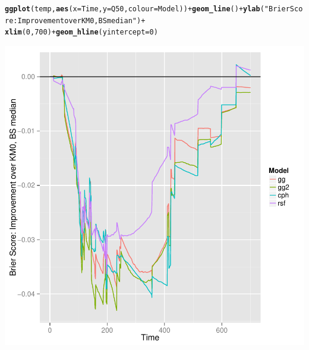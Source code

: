 \documentclass{article}\usepackage[]{graphicx}\usepackage[]{color}
\makeatletter
\def\maxwidth{ %
  \ifdim\Gin@nat@width>\linewidth
    \linewidth
  \else
    \Gin@nat@width
  \fi
}
\newcommand{\hlnum}[1]{\textcolor[rgb]{0.686,0.059,0.569}{#1}}%
\newcommand{\hlstr}[1]{\textcolor[rgb]{0.192,0.494,0.8}{#1}}%
\newcommand{\hlopt}[1]{\textcolor[rgb]{0,0,0}{#1}}%
\newcommand{\hlstd}[1]{\textcolor[rgb]{0.345,0.345,0.345}{#1}}%
\newcommand{\hlkwc}[1]{\textcolor[rgb]{0.333,0.667,0.333}{#1}}%
\newcommand{\hlkwd}[1]{\textcolor[rgb]{0.737,0.353,0.396}{\textbf{#1}}}%
\newenvironment{kframe}{%
 \def\at@end@of@kframe{}%
 \ifinner\ifhmode%
  \def\at@end@of@kframe{\end{minipage}}%
  \begin{minipage}{\columnwidth}%
 \fi\fi%
 \def\FrameCommand##1{\hskip\@totalleftmargin \hskip-\fboxsep
 \colorbox{shadecolor}{##1}\hskip-\fboxsep
     \hskip-\linewidth \hskip-\@totalleftmargin \hskip\columnwidth}%
 \MakeFramed {\advance\hsize-\width
   \@totalleftmargin\z@ \linewidth\hsize
   \@setminipage}}%
 {\par\unskip\endMakeFramed%
 \at@end@of@kframe}
\newenvironment{knitrout}{}{} %
\makeatother
\begin{document}
\begin{knitrout}
{}


\begin{kframe}\begin{alltt}
\hlkwd{ggplot}\hlstd{(temp,} \hlkwd{aes}\hlstd{(}\hlkwc{x} \hlstd{= Time,} \hlkwc{y} \hlstd{= Q50,} \hlkwc{colour} \hlstd{= Model))} \hlopt{+} \hlkwd{geom_line}\hlstd{()} \hlopt{+} \hlkwd{ylab}\hlstd{(}\hlstr{"Brier Score: Improvement over KM0, BS median"}\hlstd{)} \hlopt{+}
    \hlkwd{xlim}\hlstd{(}\hlnum{0}\hlstd{,} \hlnum{700}\hlstd{)} \hlopt{+} \hlkwd{geom_hline}\hlstd{(}\hlkwc{yintercept} \hlstd{=} \hlnum{0}\hlstd{)}
\end{alltt}


{\ttfamily\noindent\color{warningcolor}{\#\# Warning: Removed 1200 rows containing missing values (geom\_path).}}\end{kframe}

{\centering \includegraphics[width=\maxwidth]{figure/model-selection-bs-paths-6} 

}



\end{knitrout}
\end{document}
